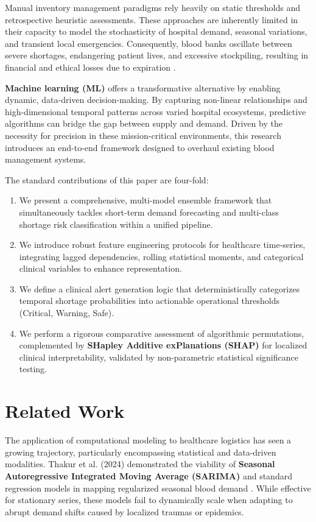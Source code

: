\documentclass[conference]{IEEEtran}
\begin{document}
Manual inventory management paradigms rely heavily on static thresholds and retrospective heuristic assessments. These approaches are inherently limited in their capacity to model the stochasticity of hospital demand, seasonal variations, and transient local emergencies. Consequently, blood banks oscillate between severe shortages, endangering patient lives, and excessive stockpiling, resulting in financial and ethical losses due to expiration \cite{b3}. 

\textbf{Machine learning (ML)} offers a transformative alternative by enabling dynamic, data-driven decision-making. By capturing non-linear relationships and high-dimensional temporal patterns across varied hospital ecosystems, predictive algorithms can bridge the gap between supply and demand. Driven by the necessity for precision in these mission-critical environments, this research introduces an end-to-end framework designed to overhaul existing blood management systems.

The standard contributions of this paper are four-fold:
\begin{enumerate}
    \item We present a comprehensive, multi-model ensemble framework that simultaneously tackles short-term demand forecasting and multi-class shortage risk classification within a unified pipeline.
    \item We introduce robust feature engineering protocols for healthcare time-series, integrating lagged dependencies, rolling statistical moments, and categorical clinical variables to enhance representation.
    \item We define a clinical alert generation logic that deterministically categorizes temporal shortage probabilities into actionable operational thresholds (Critical, Warning, Safe).
    \item We perform a rigorous comparative assessment of algorithmic permutations, complemented by \textbf{SHapley Additive exPlanations (SHAP)} for localized clinical interpretability, validated by non-parametric statistical significance testing.
\end{enumerate}

\section{Related Work}
The application of computational modeling to healthcare logistics has seen a growing trajectory, particularly encompassing statistical and data-driven modalities. Thakur et al. (2024) demonstrated the viability of \textbf{Seasonal Autoregressive Integrated Moving Average (SARIMA)} and standard regression models in mapping regularized seasonal blood demand \cite{b4}. While effective for stationary series, these models fail to dynamically scale when adapting to abrupt demand shifts caused by localized traumas or epidemics.
\end{document}
